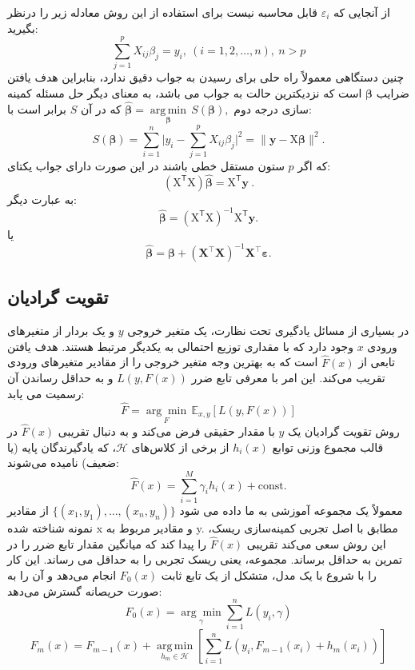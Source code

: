 \documentclass[12pt,a4paper,BCOR=.7cm,headsepline,bibliography=totoc]{report}
\begin{document}
از آنجایی که $\varepsilon _{i}$ قابل محاسبه نیست برای استفاده از این روش معادله زیر را درنظر بگیرید:
$$
{\displaystyle \sum _{j=1}^{p}X_{ij}\beta _{j}=y_{i},\ (i=1,2,\dots ,n),\ n>p}
$$
چنین دستگاهی معمولاً راه حلی برای رسیدن به جواب دقیق ندارد، بنابراین هدف یافتن ضرایب ${\displaystyle {\boldsymbol {\beta }}}$ است که نزدیکترین حالت به جواب می باشد، به معنای دیگر حل مسئله کمینه سازی درجه دوم ${\hat {\boldsymbol {\beta }}}={\underset {\boldsymbol {\beta }}{\operatorname {arg\,min} }}\,S({\boldsymbol {\beta }}),$
که در آن $S$ برابر است با:
$$
{\displaystyle S({\boldsymbol {\beta }})=\sum _{i=1}^{n}{\biggl |}y_{i}-\sum _{j=1}^{p}X_{ij}\beta _{j}{\biggr |}^{2}={\bigl \|}\mathbf {y} -\mathrm {X} {\boldsymbol {\beta }}{\bigr \|}^{2}.}
$$
که اگر $p$ ستون مستقل خطی باشند در این صورت دارای جواب یکتای:
$$
{\displaystyle (\mathrm {X} ^{\mathsf {T}}\mathrm {X} ){\hat {\boldsymbol {\beta }}}=\mathrm {X} ^{\mathsf {T}}\mathbf {y} \ .}
$$
به عبارت دیگر:
$$
{\displaystyle {\hat {\boldsymbol {\beta }}}=\left(\mathrm {X} ^{\mathsf {T}}\mathrm {X} \right)^{-1}\mathrm {X} ^{\mathsf {T}}\mathbf {y} .}
$$
یا
$$
{\displaystyle {\hat {\boldsymbol {\beta }}}={\boldsymbol {\beta }}+(\mathbf {X} ^{\top }\mathbf {X} )^{-1}\mathbf {X} ^{\top }{\boldsymbol {\varepsilon }}.}
$$

\subsection{تقویت گرادیان}
در بسیاری از مسائل یادگیری تحت نظارت، یک متغیر خروجی $y$ و یک بردار از متغیرهای ورودی $x$ وجود دارد که با مقداری توزیع احتمالی به یکدیگر مرتبط هستند. هدف یافتن تابعی از ${\displaystyle {\hat {F}}(x)}$ است که به بهترین وجه متغیر خروجی را از مقادیر متغیرهای ورودی تقریب می‌کند. این امر با معرفی تابع ضرر ${\displaystyle L(y,F(x))}$ و به حداقل رساندن آن رسمیت می یابد:
$${\displaystyle {\hat {F}}={\underset {F}{\arg \min }}\,\mathbb {E} _{x,y}[L(y,F(x))]}$$
روش تقویت گرادیان\cite{Stochastic Gradient Boosting} یک $y$ با مقدار حقیقی فرض می‌کند و به دنبال تقریبی ${\displaystyle {\hat {F}}(x)}$ در قالب مجموع وزنی توابع ${\displaystyle h_{i}(x)}$ از برخی از کلاس‌های ${\displaystyle {\mathcal {H}}}$، که یادگیرندگان پایه (یا ضعیف) نامیده می‌شوند:
$${\displaystyle {\hat {F}}(x)=\sum _{i=1}^{M}\gamma _{i}h_{i}(x)+{\mbox{const}}}.$$
معمولاً یک مجموعه آموزشی به ما داده می شود ${\displaystyle \{(x_{1},y_{1}),\dots ,(x_{n},y_{n})\}}$ از مقادیر نمونه شناخته شده x و مقادیر مربوط به y. مطابق با اصل تجربی کمینه‌سازی ریسک، این روش سعی می‌کند تقریبی ${\displaystyle {\hat {F}}(x)}$ را پیدا کند که میانگین مقدار تابع ضرر را در تمرین به حداقل برساند. مجموعه، یعنی ریسک تجربی را به حداقل می رساند. این کار را با شروع با یک مدل، متشکل از یک تابع ثابت ${\displaystyle F_{0}(x)}$ انجام می‌دهد و آن را به صورت حریصانه گسترش می‌دهد:
$${\displaystyle F_{0}(x)={\underset {\gamma }{\arg \min }}{\sum _{i=1}^{n}{L(y_{i},\gamma )}}}$$
$${\displaystyle F_{m}(x)=F_{m-1}(x)+{\underset {h_{m}\in {\mathcal {H}}}{\operatorname {arg\,min} }} \left[{\sum _{i=1}^{n}{L(y_{i},F_{m-1}(x_{i})+h_{m}(x_{i}))}} \right]}$$
\end{document}
